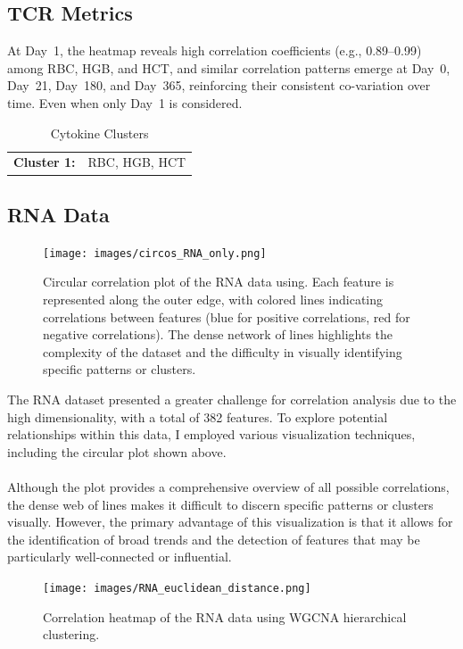 \documentclass[12pt,a4paper]{report}
\begin{document}
\subsection{TCR Metrics}
\noindent
At Day~1, the heatmap reveals high correlation coefficients (e.g., 0.89--0.99) among RBC, HGB, and HCT, and similar correlation patterns emerge at Day~0, Day~21, Day~180, and Day~365, reinforcing their consistent co-variation over time. Even when only Day~1 is considered.
\begin{table}[h!]
    \centering
    \begin{tabular}{ll}
        \textbf{Cluster 1:} &  RBC, HGB, HCT
    \end{tabular}
    \caption{Cytokine Clusters}
    \label{tab:cytokine_clusters}
\end{table}



\subsection{RNA Data}
\begin{figure}[H]
  \centering
  \texttt{[image: images/circos\_RNA\_only.png]}
 \caption[RNA data correlations circular]{Circular correlation plot of the RNA data using. Each feature is represented along the outer edge, with colored lines indicating correlations between features (blue for positive correlations, red for negative correlations). The dense network of lines highlights the complexity of the dataset and the difficulty in visually identifying specific patterns or clusters.}
  \label{fig:RNA_circos}
\end{figure}


The RNA dataset presented a greater challenge for correlation analysis due to the high dimensionality, with a total of 382 features. To explore potential relationships within this data, I employed various visualization techniques, including the circular plot shown above.\\
\\
 Although the plot provides a comprehensive overview of all possible correlations, the dense web of lines makes it difficult to discern specific patterns or clusters visually. However, the primary advantage of this visualization is that it allows for the identification of broad trends and the detection of features that may be particularly well-connected or influential.

\begin{figure}[H]
  \centering
  \texttt{[image: images/RNA\_euclidean\_distance.png]}
  \caption[RNA data correlations]{Correlation heatmap of the RNA data using  WGCNA hierarchical clustering.}
  \label{fig:RNA_heatmap}
\end{figure}
\end{document}
